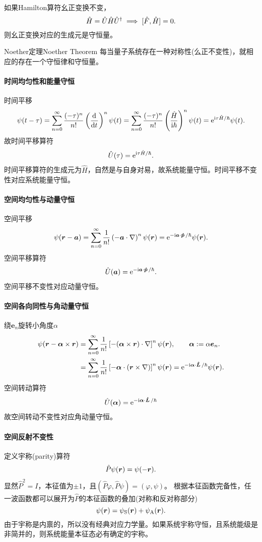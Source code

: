 如果Hamilton算符幺正变换不变，
\[
	\hat H=\hat U\hat H\hat U^\dagger\implies[\hat F,\hat H]=0.
\]
则幺正变换对应的生成元是守恒量。
\begin{theorem}{Noether定理}{Noether Theorem}
	每当量子系统存在一种对称性(么正不变性)，就相应的存在一个守恒律和守恒量。
\end{theorem}
\paragraph{时间均匀性和能量守恒}时间平移
\[
	\psi(t-\tau)=\sum_{n=0}^\infty\frac{(-\tau)^n}{n!}\left(\frac{\mathrm{d}^{{}}}{\mathrm{d}{t}^{{}}}\right)^n\psi(t)=\sum_{n=0}^\infty\frac{(-\tau)^n}{n!}\left(\frac{\hat H}{\mathrm{i}\hbar}\right)^n\psi(t)=\mathop{}\!\mathrm{e}^{\mathrm{i}\tau\hat H/\hbar}\psi(t).
\]
故时间平移算符
\begin{align}
	\hat U(\tau)=\mathop{}\!\mathrm{e}^{\mathrm{i}\tau\hat H/\hbar}.
\end{align}
时间平移算符的生成元为$\hat H$，自然是与自身对易，故系统能量守恒。时间平移不变性对应系统能量守恒。
\paragraph{空间均匀性与动量守恒}空间平移
\[
	\psi(\bm r-\bm a)=\sum_{n=0}^\infty\frac{1}{n!}\left(-\bm a\cdot\nabla\right)^n\psi(\bm r)=\mathop{}\!\mathrm{e}^{-\mathrm{i}\bm a\cdot\bm{\hat p}\!\mathop{}/\hbar}\psi(\bm r).
\]
空间平移算符
\begin{align}
	\hat U(\bm a)=\mathop{}\!\mathrm{e}^{-\mathrm{i}\bm a\cdot\bm{\hat p}\!\mathop{}/\hbar}.
\end{align}
空间平移不变性对应动量守恒。
\paragraph{空间各向同性与角动量守恒}绕$\bm e_n$旋转小角度$\alpha$
\begin{align*}
	\psi(\bm r-\bm\alpha\times\bm r)&=\sum_{n=0}^\infty\frac{1}{n!}\left[-(\bm\alpha\times\bm r)\cdot\nabla\right]^n\psi(\bm r),\qquad\bm\alpha:=\alpha\bm e_n.\\
	&=\sum_{n=0}^\infty\frac{1}{n!}\left[-\bm\alpha\cdot(\bm r\times\nabla)\right]^n\psi(\bm r)=\mathop{}\!\mathrm{e}^{-\mathrm{i}\bm\alpha\cdot\bm{\hat L}\!\mathop{}/\hbar}\psi(\bm r).
\end{align*}
空间转动算符
\begin{align}
	\hat U(\bm\alpha)=\mathop{}\!\mathrm{e}^{-\mathrm{i}\bm\alpha\cdot\bm{\hat L}\!\mathop{}/\hbar}
\end{align}
故空间转动不变性对应角动量守恒。
\paragraph{空间反射不变性}定义宇称(parity)算符
\begin{align}
	\hat P\psi(\bm r)=\psi(-\bm r).
\end{align}
显然$\hat P^2=I$，本征值为$\pm 1$，且$(\hat P\varphi,\hat P\psi)=(\varphi,\psi)$。
根据本征函数完备性，任一波函数都可以展开为$\hat P$的本征函数的叠加(对称和反对称部分)\[
	\psi(\bm r)=\psi_\mathrm S(\bm r)+\psi_\mathrm A(\bm r).
\]
由于宇称是内禀的，所以没有经典对应力学量。如果系统宇称守恒，且系统能级是非简并的，则系统能量本征态必有确定的宇称。

